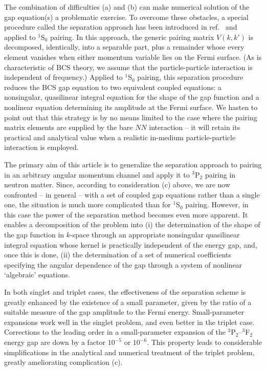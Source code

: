 The combination of difficulties (a) and (b) can make numerical
solution of the gap equation(s) a problematic exercise. To overcome 
these obstacles, a special procedure called the separation approach 
has been introduced in ref.~\cite{kkc} and applied to $^1$S$_0$ pairing. 
In this approach, the generic pairing matrix $V(k,k')$ is decomposed, 
identically, into a separable part, plus a remainder whose every
element vanishes when either momentum variable lies on the Fermi 
surface.  (As is characteristic of BCS theory, we assume that
the particle-particle interaction is independent of frequency.) 
Applied to $^1$S$_0$ pairing, this separation procedure reduces
the BCS gap equation to two equivalent coupled equations:  a
nonsingular, quasilinear integral equation for the shape of
the gap function and a nonlinear equation determining its
amplitude at the Fermi surface.  We hasten to point out that
this strategy is by no means limited to the case where the
pairing matrix elements are supplied by the bare $NN$ 
interaction -- it will retain its practical and analytical
value when a realistic in-medium particle-particle interaction
is employed.

The primary aim of this article is to generalize the separation
approach to pairing in an arbitrary angular momentum channel
and apply it to $^3$P$_2$ pairing in neutron matter.  Since,
according to consideration (c) above, we are now confronted --
in general -- with a set of coupled gap equations rather than
a single one, the situation is much more complicated than for $^1$S$_0$ 
pairing.  However, in this case the power of the separation
method becomes even more apparent.  It enables a decomposition
of the problem into (i) the determination of the shape of the gap
function in $k$-space through an appropriate nonsingular quasilinear 
integral equation whose kernel is practically independent of the energy
gap, and, once this is done, (ii) the determination of a set of 
numerical coefficients specifying the angular dependence of the 
gap through a system of nonlinear `algebraic' equations.  

In both singlet and triplet cases, the effectiveness of the separation 
scheme is greatly enhanced by the existence of a small parameter, 
given by the ratio of a suitable measure of the gap amplitude to 
the Fermi energy.  Small-parameter expansions work well in the
singlet problem, and even better in the triplet case.  Corrections to 
the leading order in a small-parameter expansion of the 
$^3$P$_2$--$^3$F$_2$ energy gap are down by a factor $10^{-5}$ or 
$10^{-6}$.   This property leads to considerable simplifications in 
the analytical and numerical treatment of the triplet problem, greatly 
ameliorating complication (c).   

